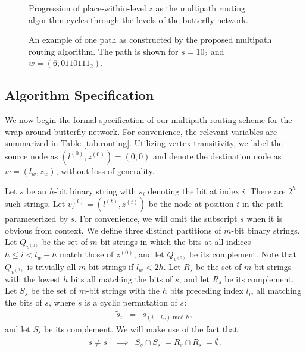 \documentclass[10pt,letterpaper]{article}
\newcommand{\beq}{\begin{eqnarray}}
\newcommand{\eeq}{\end{eqnarray}}
\begin{document}
\begin{figure}[h!]
\caption{
Progression of place-within-level $z$ as the multipath routing algorithm
cycles through the levels of the butterfly network.
\label{fig:route-overview}
}
\end{figure}

\begin{figure}[!h]
\begin{center}
\end{center}
\caption{
An example of one path as constructed by the proposed multipath
routing algorithm.
The path is shown for $s = 10_2$
and $w = (6, 0110111_2)$.
\label{fig:routing}
}
\end{figure}

\subsection*{Algorithm Specification}

We now begin the formal specification of our multipath routing scheme for the
wrap-around butterfly network.
For convenience, the relevant variables are summarized in Table \ref{tab:routing}.
Utilizing vertex transitivity, we label the source node as
$(l^{(0)}, z^{(0)}) = (0, 0)$ and denote the destination node as $w = (l_w, z_w)$,
without loss of generality.

Let $s$ be an $h$-bit binary string with $s_i$ denoting the bit at index $i$.
There are $2^h$ such strings.
Let $v_s^{(t)} = (l^{(t)}, z^{(t)})$ be the node at position $t$
in the path parameterized by $s$.
For convenience,
we will omit the subscript $s$ when it is obvious from context.
We define three distinct partitions of $m$-bit binary strings.
Let $Q_{v^{(0)}}$ be the set of $m$-bit
strings in which the bits at
all indices $h \leq i < l_w - h$ match those of $z^{(0)}$,
and let $\overline{Q_{v^{(0)}}}$ be its complement.
Note that $Q_{v^{(0)}}$ is trivially all $m$-bit strings if $l_w < 2h$.
Let $R_s$ be the set of $m$-bit strings with the lowest $h$
bits all matching the bits of $s$,
and let $\overline{R_s}$ be its complement.
Let $S_s$ be the set of $m$-bit strings with the $h$ bits
preceding index $l_w$ all matching the bits of $\tilde{s}$,
where $\tilde{s}$ is a cyclic permutation of $s$:
\beq
\tilde{s}_i &=& s_{(i + l_w) \text{ mod } h},
\eeq
and let $\overline{S_s}$ be its complement.
We will make use of the fact that:
\beq
s \neq s^\prime &\implies&
S_s \cap S_{s^\prime} = R_s \cap R_{s^\prime} = \emptyset.
\eeq
\end{document}
